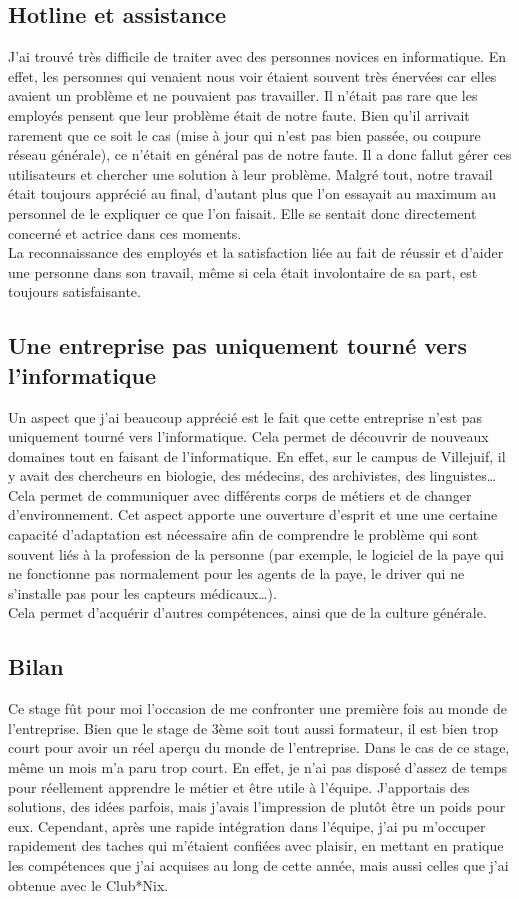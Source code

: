 \subsection{Hotline et assistance}
J'ai trouvé très difficile de traiter avec des personnes novices en informatique. En effet, les personnes qui venaient nous voir étaient souvent très énervées car elles avaient un problème et ne pouvaient pas travailler. Il n'était pas rare que les employés pensent que leur problème était de notre faute. Bien qu'il arrivait rarement que ce soit le cas (mise à jour qui n'est pas bien passée, ou coupure réseau générale), ce n'était en général pas de notre faute. Il a donc fallut gérer ces utilisateurs et chercher une solution à leur problème. Malgré tout, notre travail était toujours apprécié au final, d'autant plus que l'on essayait au maximum au personnel de le expliquer ce que l'on faisait. Elle se sentait donc directement concerné et actrice dans ces moments.\\
La reconnaissance des employés et la satisfaction liée au fait de réussir et d'aider une personne dans son travail, même si cela était involontaire de sa part, est toujours satisfaisante.

\subsection{Une entreprise pas uniquement tourné vers l'informatique}
Un aspect que j'ai beaucoup apprécié est le fait que cette entreprise n'est pas uniquement tourné vers l'informatique. Cela permet de découvrir de nouveaux domaines tout en faisant de l'informatique. En effet, sur le campus de Villejuif, il y avait des chercheurs en biologie, des médecins, des archivistes, des linguistes\dots \\
Cela permet de communiquer avec différents corps de métiers et de changer d'environnement. Cet aspect apporte une ouverture d'esprit et une une certaine capacité d'adaptation est nécessaire afin de comprendre le problème qui sont souvent liés à la profession de la personne (par exemple, le logiciel de la paye qui ne fonctionne pas normalement pour les agents de la paye, le driver qui ne s'installe pas pour les capteurs médicaux\dots). \\
Cela permet d'acquérir d'autres compétences, ainsi que de la culture générale.

\subsection{Bilan}
Ce stage fût pour moi l'occasion de me confronter une première fois au monde de l'entreprise. Bien que le stage de 3ème soit tout aussi formateur, il est bien trop court pour avoir un réel aperçu du monde de l'entreprise. Dans le cas de ce stage, même un mois m'a paru trop court. En effet, je n'ai pas disposé d'assez de temps pour réellement apprendre le métier et être utile à l'équipe. J'apportais des solutions, des idées parfois, mais j'avais l'impression de plutôt être un poids pour eux. 
\smallbreak
Cependant, après une rapide intégration dans l'équipe, j'ai pu m'occuper rapidement des taches qui m'étaient confiées avec plaisir, en mettant en pratique les compétences que j'ai acquises au long de cette année, mais aussi celles que j'ai obtenue avec le Club*Nix. 
